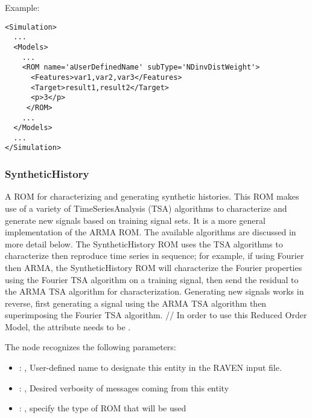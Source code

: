 \hspace{24pt}
Example:
\begin{lstlisting}[style=XML,morekeywords={name,subType}]
<Simulation>
  ...
  <Models>
    ...
    <ROM name='aUserDefinedName' subType='NDinvDistWeight'>
      <Features>var1,var2,var3</Features>
      <Target>result1,result2</Target>
      <p>3</p>
     </ROM>
    ...
  </Models>
  ...
</Simulation>
\end{lstlisting}


\subsubsection{SyntheticHistory}
  A ROM for characterizing and generating synthetic histories. This ROM makes use of         a
  variety of TimeSeriesAnalysis (TSA) algorithms to characterize and generate new         signals
  based on training signal sets. It is a more general implementation of the ARMA ROM. The available
  algorithms are discussed in more detail below. The SyntheticHistory ROM uses the TSA algorithms to
  characterize then reproduce time series in sequence; for example, if using Fourier then ARMA, the
  SyntheticHistory ROM will characterize the Fourier properties using the Fourier TSA algorithm on a
  training signal, then send the residual to the ARMA TSA algorithm for characterization. Generating
  new signals works in reverse, first generating a signal using the ARMA TSA algorithm then
  superimposing the Fourier TSA algorithm.         //         In order to use this Reduced Order
  Model, the  attribute          needs to be
  .

  The  node recognizes the following parameters:
    \begin{itemize}
      \item {}: , 
        User-defined name to designate this entity in the RAVEN input file.
      \item {}: , 
        Desired verbosity of messages coming from this entity
      \item {}: , 
        specify the type of ROM that will be used
  \end{itemize}

